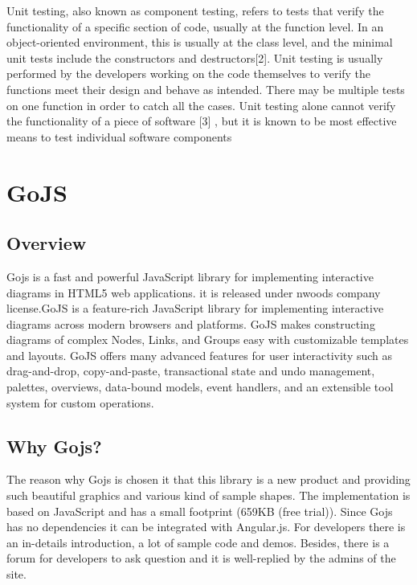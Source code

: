 \documentclass[14pt,a4paper]{extreport}
\begin{document}
Unit testing, also known as component testing, refers to tests that verify the functionality of a specific section of code, usually at the function level. In an object-oriented environment, this is usually at the class level, and the minimal unit tests include the constructors and destructors[2].  Unit testing is usually performed by the developers working on the code themselves to verify the functions meet their design and behave as intended. There may be multiple tests on one function in order to catch all the cases. Unit testing alone cannot verify the functionality of a piece of software [3] , but it is known to be most effective means to test individual software components

	\section{GoJS}
		\subsection{Overview}
		Gojs is a fast and powerful JavaScript library for implementing interactive diagrams in HTML5 web applications. it is released under nwoods company license.GoJS is a feature-rich JavaScript library for implementing interactive diagrams across modern browsers and platforms. GoJS makes constructing diagrams of complex Nodes, Links, and Groups easy with customizable templates and layouts. GoJS offers many advanced features for user interactivity such as drag-and-drop, copy-and-paste, transactional state and undo management, palettes, overviews, data-bound models, event handlers, and an extensible tool system for custom operations. 
		
		\subsection{Why Gojs?}
		The reason why  Gojs is chosen it that this library is a new product and providing such beautiful graphics and various kind of sample shapes. The implementation is based on JavaScript and has a small footprint (659KB (free trial)). Since Gojs has no dependencies it can be integrated with Angular.js. For developers there is an in-details introduction, a lot of sample code and demos. Besides, there is a forum for developers to ask question and it is well-replied by the admins of the site. 
		
\end{document}
